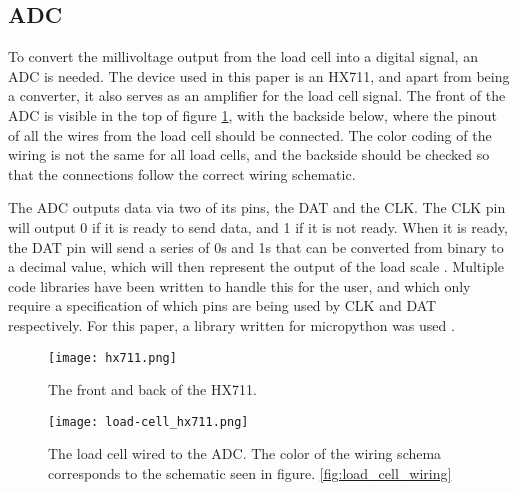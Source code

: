 \subsection{ADC}
To convert the millivoltage output from the load cell into a digital signal, an ADC is needed. The device used in this paper is an HX711, and apart from being a converter, it also serves as an amplifier for the load cell signal. The front of the ADC is visible in the top of figure \ref{fig:hx711}, with the backside below, where the pinout of all the wires from the load cell should be connected. The color coding of the wiring is not the same for all load cells, and the backside should be checked so that the connections follow the correct wiring schematic. 

The ADC outputs data via two of its pins, the DAT and the CLK. The CLK pin will output 0 if it is ready to send data, and 1 if it is not ready. When it is ready, the DAT pin will send  a series of 0s and 1s that can be converted from binary to a decimal value, which will then represent the output of the load scale \cite{hx711-datasheet}. Multiple code libraries have been written to handle this for the user, and which only require a specification of which pins are being used by CLK and DAT respectively. For this paper, a library written for micropython was used \cite{hx711-lopy}.

\begin{figure}[h]
	\centering
	\texttt{[image: hx711.png]}
	\caption{The front and back of the HX711.}
	\label{fig:hx711}
\end{figure}

\begin{figure}[h]
	\centering
	\texttt{[image: load-cell\_hx711.png]}
	\caption{The load cell wired to the ADC. The color of the wiring schema corresponds to the schematic seen in figure. \ref{fig:load_cell_wiring}}
	\label{fig:load_cell_hx711}
\end{figure}

